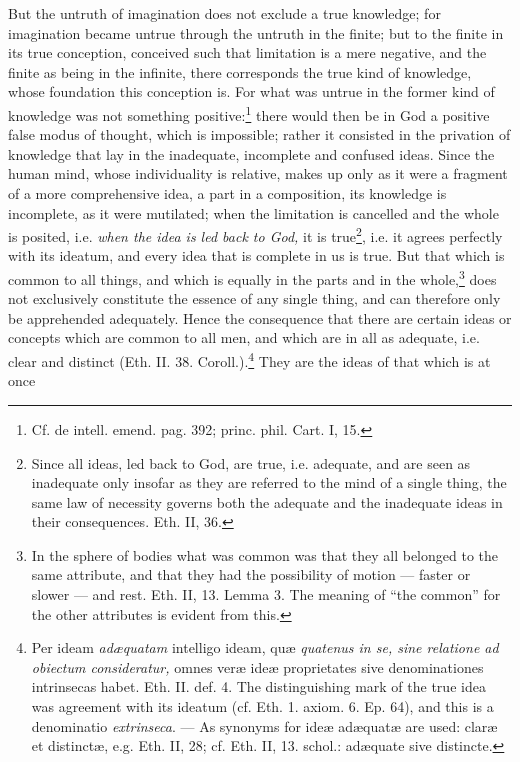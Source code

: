 \documentclass[12pt,a4paper,openany]{book}
\newcommand{\opage}[1]{\marginnote{\footnotesize\textit{[#1]}}}
\begin{document}
But the untruth of imagination does not exclude a true knowledge;
for imagination became untrue through the untruth in the
finite; but to the finite in its true conception,
conceived such that limitation is a mere negative, and
the finite as being in the infinite, there corresponds the true
kind of knowledge, whose foundation this conception is. For what was untrue
in the former kind of knowledge was not something
positive:\footnote{Cf. de intell. emend. pag. 392; princ.
phil. Cart. I, 15.} there would then be in God a positive false
modus of thought, which is impossible; rather it consisted in the
privation of knowledge that lay in the inadequate,
incomplete and confused ideas. Since the human mind,
whose individuality is relative, makes up only as it were a fragment
of a more comprehensive idea, a part in a composition, its
knowledge is incomplete, as it were mutilated; when
the limitation is cancelled and the whole is posited, i.e. \emph{when the idea is led
back to God,} it is true\footnote{Since all ideas, led
back to God, are true, i.e. adequate, and are seen as
inadequate only insofar as they are referred to the mind of a single thing,
the same law of necessity governs both the adequate and the
inadequate ideas in their consequences. Eth. II, 36.}, i.e.
it agrees perfectly with its
\opage{92}\setcounter{footnote}{0}ideatum, and every idea that is complete in us is true. But
that which is common to all things, and which is equally in the parts
and in the whole,\footnote{In the sphere of bodies what was common
was that they all belonged to the same attribute, and that they had
the possibility of motion --- faster or slower --- and
rest. Eth. II, 13. Lemma 3. The meaning of ``the common'' for
the other attributes is evident from this.} does not
exclusively constitute the essence of any single thing, and can therefore only be apprehended
adequately. Hence the consequence that there are certain ideas
or concepts which are common to all men, and which are in all
as adequate, i.e. clear and distinct (Eth. II. 38.
Coroll.).\footnote{Per ideam \emph{adæquatam} intelligo ideam,
quæ \emph{quatenus in se, sine relatione ad obiectum consideratur,}
omnes veræ ideæ proprietates sive denominationes intrinsecas
habet. Eth. II. def. 4. The distinguishing mark of the true idea was
agreement with its ideatum (cf. Eth. 1. axiom. 6.
Ep. 64), and this is a denominatio \emph{extrinseca}. --- As
synonyms for ideæ adæquatæ are used: claræ et distinctæ, e.g.
Eth. II, 28; cf. Eth. II, 13. schol.: adæquate sive
distincte.} They are the ideas of that which is at once
\end{document}
